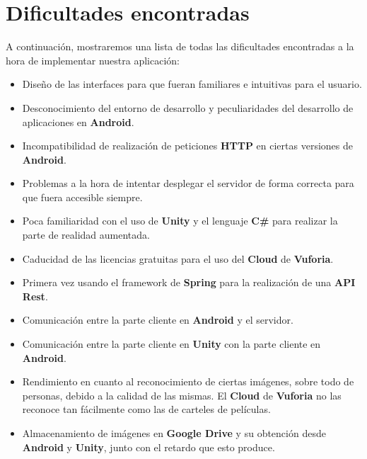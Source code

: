 \section{Dificultades encontradas}
\label{makereference4.4}
A continuación, mostraremos una lista de todas las dificultades encontradas a la hora de implementar nuestra aplicación:
\begin{itemize}
    \item Diseño de las interfaces para que fueran familiares e intuitivas para el usuario.
    \item Desconocimiento del entorno de desarrollo y peculiaridades del desarrollo de aplicaciones en \textbf{Android}.
    \item Incompatibilidad de realización de peticiones \textbf{HTTP} en ciertas versiones de \textbf{Android}.
    \item Problemas a la hora de intentar desplegar el servidor de forma correcta para que fuera accesible siempre.
    \item Poca familiaridad con el uso de \textbf{Unity} y el lenguaje \textbf{C\#} para realizar la parte de realidad aumentada.
    \item Caducidad de las licencias gratuitas para el uso del \textbf{Cloud} de \textbf{Vuforia}.
    \item Primera vez usando el framework de \textbf{Spring} para la realización de una \textbf{API Rest}.
    \item Comunicación entre la parte cliente en \textbf{Android} y el servidor.
    \item Comunicación entre la parte cliente en \textbf{Unity} con la parte cliente en \textbf{Android}.
    \item Rendimiento en cuanto al reconocimiento de ciertas imágenes, sobre todo de personas, debido a la calidad de las mismas. El \textbf{Cloud} de \textbf{Vuforia} no las reconoce tan fácilmente como las de carteles de películas.
    \item Almacenamiento de imágenes en \textbf{Google Drive} y su obtención desde \textbf{Android} y \textbf{Unity}, junto con el retardo que esto produce.
\end{itemize}
